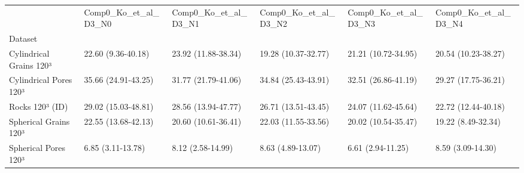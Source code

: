 \begin{tabular}{llllll}
\toprule
 & Comp0_Ko_et_al_D3_N0 & Comp0_Ko_et_al_D3_N1 & Comp0_Ko_et_al_D3_N2 & Comp0_Ko_et_al_D3_N3 & Comp0_Ko_et_al_D3_N4 \\
Dataset &  &  &  &  &  \\
\midrule
Cylindrical Grains 120³ & 22.60 (9.36-40.18) & 23.92 (11.88-38.34) & 19.28 (10.37-32.77) & 21.21 (10.72-34.95) & 20.54 (10.23-38.27) \\
Cylindrical Pores 120³ & 35.66 (24.91-43.25) & 31.77 (21.79-41.06) & 34.84 (25.43-43.91) & 32.51 (26.86-41.19) & 29.27 (17.75-36.21) \\
Rocks 120³ (ID) & 29.02 (15.03-48.81) & 28.56 (13.94-47.77) & 26.71 (13.51-43.45) & 24.07 (11.62-45.64) & 22.72 (12.44-40.18) \\
Spherical Grains 120³ & 22.55 (13.68-42.13) & 20.60 (10.61-36.41) & 22.03 (11.55-33.56) & 20.02 (10.54-35.47) & 19.22 (8.49-32.34) \\
Spherical Pores 120³ & 6.85 (3.11-13.78) & 8.12 (2.58-14.99) & 8.63 (4.89-13.07) & 6.61 (2.94-11.25) & 8.59 (3.09-14.30) \\
\bottomrule
\end{tabular}
